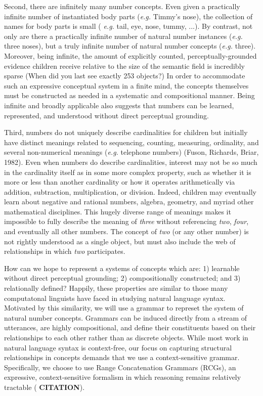 \documentclass[10pt,letterpaper]{article}
\begin{document}
Second, there are infinitely many number concepts. Even given a
practically infinite number of instantiated body parts ({\it e.g.}
Timmy's nose), the collection of names for body parts is small ({\it
  e.g.} tail, eye, nose, tummy, ...). By contrast, not only are there
a practically infinite number of natural number instances ({\it e.g.}
three noses), but a truly infinite number of natural number concepts
({\it e.g.} three). Moreover, being infinite, the amount of explicitly
counted, perceptually-grounded evidence children receive relative to
the size of the semantic field is incredibly sparse (When did you last
see exactly 253 objects?) In order to accommodate such an expressive
conceptual system in a finite mind, the concepts themselves must be
constructed as needed in a systematic and compositional manner.
Being infinite and broadly applicable also suggests that numbers can
be learned, represented, and understood without direct perceptual
grounding.

Third, numbers do not uniquely describe cardinalities for children but
initially have distinct meanings related to sequencing, counting,
measuring, ordinality, and several non-numerical meanings ({\it e.g.}
telephone numbers) (Fuson, Richards, Briar, 1982). Even when numbers
do describe cardinalities, interest may not be so much in the
cardinality itself as in some more complex property, such as whether
it is more or less than another cardinality or how it operates
arithmetically via addition, subtraction, multiplication, or division.
Indeed, children may eventually learn about negative and rational
numbers, algebra, geometry, and myriad other mathematical disciplines.
This hugely diverse range of meanings makes it impossible to fully
describe the meaning of \emph{three} without referencing \emph{two},
\emph{four}, and eventually all other numbers. The concept of
\emph{two} (or any other number) is not rightly understood as a single
object, but must also include the web of relationships in which
\emph{two} participates.

How can we hope to represent a systems of concepts which are: 1)
learnable without direct perceptual grounding; 2) compositionally
constructed; and 3) relationally defined? Happily, these properties
are similar to those many computatonal linguists have faced in
studying natural language syntax. Motivated by this similarity, we
will use a grammar to represet the system of natural number concepts.
Grammars can be induced directly from a stream of utterances, are
highly compositional, and define their constituents based on their
relationships to each other rather than as discrete objects. While
most work in natural language syntax is context-free, our focus on
capturing structural relationships in concepts demands that we use a
context-sensitive grammar. Specifically, we choose to use Range
Concatenation Grammars (RCGs), an expressive, context-sensitive
formalism in which reasoning remains relatively tractable ({\bf
  CITATION}).
\end{document}

